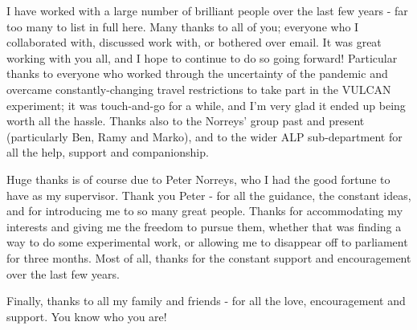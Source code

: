 
I have worked with a large number of brilliant people over the last few years - far too many to list in full here. Many thanks to all of you; everyone who I collaborated with, discussed work with, or bothered over email. It was great working with you all, and I hope to continue to do so going forward! Particular thanks to everyone who worked through the uncertainty of the pandemic and overcame constantly-changing travel restrictions to take part in the VULCAN experiment; it was touch-and-go for a while, and I'm very glad it ended up being worth all the hassle. Thanks also to the Norreys' group past and present (particularly Ben, Ramy and Marko), and to the wider ALP sub-department for all the help, support and companionship.

Huge thanks is of course due to Peter Norreys, who I had the good fortune to have as my supervisor. Thank you Peter - for all the guidance, the constant ideas, and for introducing me to so many great people. Thanks for accommodating my interests and giving me the freedom to pursue them, whether that was finding a way to do some experimental work, or allowing me to disappear off to parliament for three months. Most of all, thanks for the constant support and encouragement over the last few years.

Finally, thanks to all my family and friends - for all the love, encouragement and support. You know who you are!


